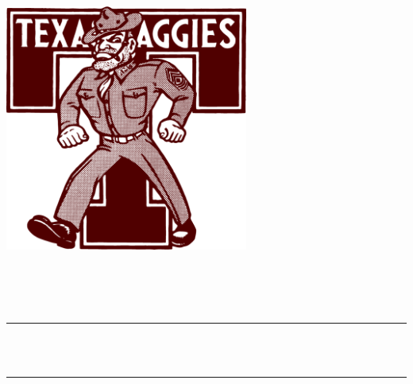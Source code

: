 \begin{titlepage}

\newcommand{\HRule}{\rule{\linewidth}{0.5mm}} %

\centering
\includegraphics[width=8cm]{title/logo.png}\\[1cm] %
 

\center %


\textsc{\LARGE \assignname}\\[1.5cm] %
\textsc{\Large \coursecode}\\[0.5cm] %
\textsc{\large \coursetitle}\\[0.5cm]  %

\makeatletter
\HRule \\[0.4cm]
{ \huge \bfseries \@title}\\[0.4cm] %
\HRule \\[1.5cm]
 

\end{titlepage}
